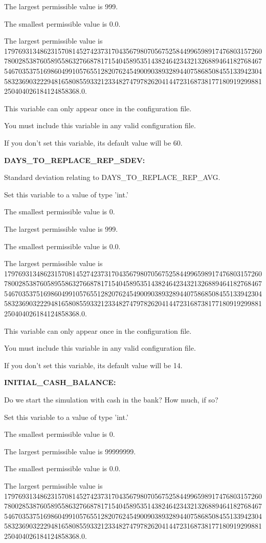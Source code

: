 The largest permissible value is 999.

The smallest permissible value is 0.0.

The largest permissible value is 179769313486231570814527423731704356798070567525844996598917476803157260780028538760589558632766878171540458953514382464234321326889464182768467546703537516986049910576551282076245490090389328944075868508455133942304583236903222948165808559332123348274797826204144723168738177180919299881250404026184124858368.0.

This variable can only appear once in the configuration file.

You must include  this variable in any valid configuration file.

If you don't set this variable, its default value will be 60.


\textbf{DAYS\_TO\_REPLACE\_REP\_SDEV:}


Standard deviation relating to DAYS\_TO\_REPLACE\_REP\_AVG.

Set this variable to a value of type 'int.'

The smallest permissible value is 0.

The largest permissible value is 999.

The smallest permissible value is 0.0.

The largest permissible value is 179769313486231570814527423731704356798070567525844996598917476803157260780028538760589558632766878171540458953514382464234321326889464182768467546703537516986049910576551282076245490090389328944075868508455133942304583236903222948165808559332123348274797826204144723168738177180919299881250404026184124858368.0.

This variable can only appear once in the configuration file.

You must include  this variable in any valid configuration file.

If you don't set this variable, its default value will be 14.


\textbf{INITIAL\_CASH\_BALANCE:}


Do we start the simulation with cash in the bank?  How much, if so?

Set this variable to a value of type 'int.'

The smallest permissible value is 0.

The largest permissible value is 99999999.

The smallest permissible value is 0.0.

The largest permissible value is 179769313486231570814527423731704356798070567525844996598917476803157260780028538760589558632766878171540458953514382464234321326889464182768467546703537516986049910576551282076245490090389328944075868508455133942304583236903222948165808559332123348274797826204144723168738177180919299881250404026184124858368.0.


